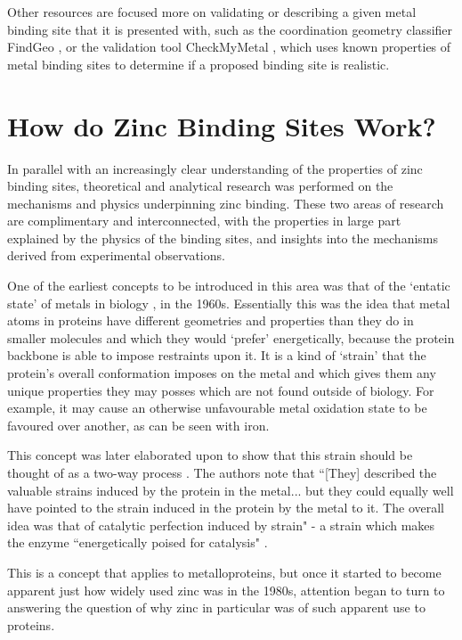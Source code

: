 Other resources are focused more on validating or describing a given metal binding site that it is presented with, such as the coordination geometry classifier FindGeo \cite{andreini2012findgeo}, or the validation tool CheckMyMetal \cite{zheng2017checkmymetal}, which uses known properties of metal binding sites to determine if a proposed binding site is realistic.

\section{How do Zinc Binding Sites Work?}

In parallel with an increasingly clear understanding of the properties of zinc binding sites, theoretical and analytical research was performed on the mechanisms and physics underpinning zinc binding. These two areas of research are complimentary and interconnected, with the properties in large part explained by the physics of the binding sites, and insights into the mechanisms derived from experimental observations.

One of the earliest concepts to be introduced in this area was that of the `entatic state' of metals in biology \cite{vallee1968metalloenzymes}, in the 1960s. Essentially this was the idea that metal atoms in proteins have different geometries and properties than they do in smaller molecules and which they would `prefer' energetically, because the protein backbone is able to impose restraints upon it. It is a kind of `strain' that the protein's overall conformation imposes on the metal and which gives them any unique properties they may posses which are not found outside of biology. For example, it may cause an otherwise unfavourable metal oxidation state to be favoured over another, as can be seen with iron.

This concept was later elaborated upon to show that this strain should be thought of as a two-way process \cite{williams1985symbiosis}. The authors note that ``[They] described the valuable strains induced by the protein in the metal... but they could equally well have pointed to the strain induced in the protein by the metal to it. The overall idea was that of catalytic perfection induced by strain" - a strain which makes the enzyme ``energetically poised for catalysis" \cite{vallee1984metallobiochemistry}.

This is a concept that applies to metalloproteins, but once it started to become apparent just how widely used zinc was in the 1980s, attention began to turn to answering the question of why zinc in particular was of such apparent use to proteins.

